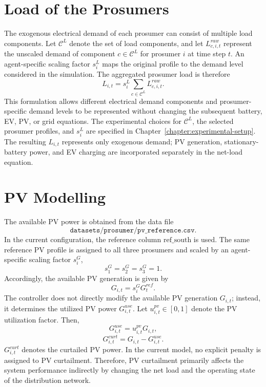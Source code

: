 \section{Load of the Prosumers}\label{sec:prosumer-load}

The exogenous electrical demand of each prosumer can consist of multiple load components. Let \(\mathcal{C}^{L}\) denote the set of load components, and let \(L^{raw}_{c,i,t}\) represent the unscaled demand of component \(c\in\mathcal{C}^{L}\) for prosumer \(i\) at time step \(t\). An agent-specific scaling factor \(s^L_i\) maps the original profile to the demand level considered in the simulation. The aggregated prosumer load is therefore
\[
  L_{i,t}=s^L_i\sum_{c\in\mathcal{C}^{L}}L^{raw}_{c,i,t}.
\]
This formulation allows different electrical demand components and prosumer-specific demand levels to be represented without changing the subsequent battery, EV, PV, or grid equations. The experimental choices for \(\mathcal{C}^{L}\), the selected prosumer profiles, and \(s^L_i\) are specified in Chapter~\ref{chapter:experimental-setup}. The resulting \(L_{i,t}\) represents only exogenous demand; PV generation, stationary-battery power, and EV charging are incorporated separately in the net-load equation.

\section{PV Modelling}

The available PV power is obtained from the data file
\[
  \texttt{datasets/prosumer/pv\_reference.csv}.
\]
In the current configuration, the reference column \(\mathrm{ref\_south}\) is used. The same reference PV profile is assigned to all three prosumers and scaled by an agent-specific scaling factor \(s^G_i\),
\[
  s^G_1=s^G_2=s^G_3=1.
\]
Accordingly, the available PV generation is given by
\[
  G_{i,t}=s^G_i G^{ref}_t.
\]
The controller does not directly modify the available PV generation \(G_{i,t}\); instead, it determines the utilized PV power \(G^{use}_{i,t}\). Let \(u^{pv}_{i,t}\in[0,1]\) denote the PV utilization factor. Then,
\[
  G^{use}_{i,t}=u^{pv}_{i,t}G_{i,t},
\]
\[
  G^{curt}_{i,t}=G_{i,t}-G^{use}_{i,t}.
\]
\(G^{curt}_{i,t}\) denotes the curtailed PV power. In the current model, no explicit penalty is assigned to PV curtailment. Therefore, PV curtailment primarily affects the system performance indirectly by changing the net load and the operating state of the distribution network.

